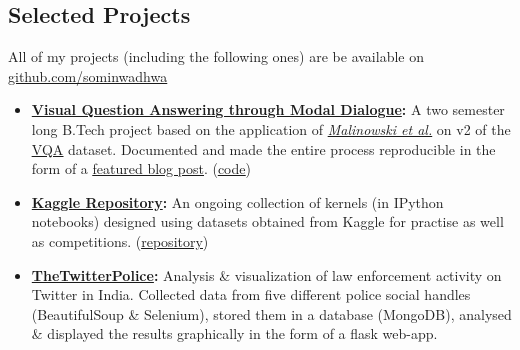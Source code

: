 \documentclass[margin,line]{res}
\begin{document}
\begin{resume}
\section{\sc Selected Projects}
All of my projects (including the following ones) are be available on {\href{https://github.com/sominwadhwa}{\underline{github.com/sominwadhwa}}}\\
\begin{itemize}[leftmargin=*]
\item {\bf {\href{https://github.com/sominwadhwa/vqamd_floyd}{Visual Question Answering through Modal Dialogue}:}}
A two semester long B.Tech project based on the application of \textit{\href{https://arxiv.org/pdf/1505.01121.pdf}{Malinowski et al.}} on v2 of the {\href{http://visualqa.org/}{\underline{VQA}}} dataset. Documented and made the entire process reproducible in the form of a \href{https://blog.floydhub.com/asking-questions-to-images-with-deep-learning/}{\underline{featured blog post}}. ({\href{https://github.com/sominwadhwa/vqamd_floyd}{\underline{code}}})
\item {\bf {\href{https://github.com/sominwadhwa/Kaggle}{Kaggle Repository}:}}
An ongoing collection of kernels (in IPython notebooks) designed using datasets obtained from Kaggle for practise as well as competitions. ({\href{https://github.com/sominwadhwa/Kaggle}{\underline{repository}}})
\item {\bf {\href{https://github.com/sominwadhwa/TheTwitterPolice}{TheTwitterPolice}:}}
Analysis \& visualization of law enforcement activity on Twitter in India. Collected data from five different police social handles (BeautifulSoup \& Selenium), stored them in a database (MongoDB), analysed \& displayed the results graphically in the form of a flask web-app.
\end{itemize}

\iffalse
\section{\sc Technical Skills}
{\bf Strongest Areas}: Machine Learning (Classification, Regression, Feature Engineering), Algorithms, Statistical Data Analysis\\
{\bf Languages/Tools/Software}: Python (scikit-learn, Keras, NumPy, Pandas \& others), Java, SQL, MongoDB, \LaTeX, MS Excel
\fi


\end{resume}
\end{document}
